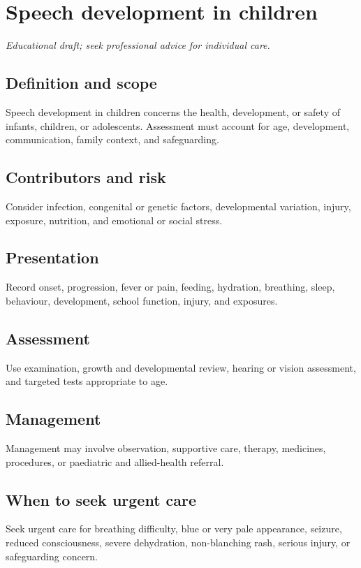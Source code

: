 \chapter{Speech development in children}
\medskip
\noindent\textit{Educational draft; seek professional advice for individual care.}

\section*{Definition and scope}
Speech development in children concerns the health, development, or safety of infants, children, or adolescents. Assessment must account for age, development, communication, family context, and safeguarding.

\section*{Contributors and risk}
Consider infection, congenital or genetic factors, developmental variation, injury, exposure, nutrition, and emotional or social stress.

\section*{Presentation}
Record onset, progression, fever or pain, feeding, hydration, breathing, sleep, behaviour, development, school function, injury, and exposures.

\section*{Assessment}
Use examination, growth and developmental review, hearing or vision assessment, and targeted tests appropriate to age.

\section*{Management}
Management may involve observation, supportive care, therapy, medicines, procedures, or paediatric and allied-health referral.

\section*{When to seek urgent care}
Seek urgent care for breathing difficulty, blue or very pale appearance, seizure, reduced consciousness, severe dehydration, non-blanching rash, serious injury, or safeguarding concern.

